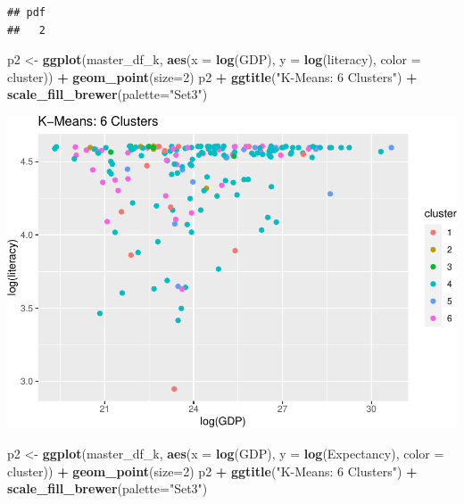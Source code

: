 \documentclass[]{article}
\newenvironment{Shaded}{\begin{snugshade}}{\end{snugshade}}
\newcommand{\DataTypeTok}[1]{\textcolor[rgb]{0.13,0.29,0.53}{#1}}
\newcommand{\DecValTok}[1]{\textcolor[rgb]{0.00,0.00,0.81}{#1}}
\newcommand{\KeywordTok}[1]{\textcolor[rgb]{0.13,0.29,0.53}{\textbf{#1}}}
\newcommand{\NormalTok}[1]{#1}
\newcommand{\OperatorTok}[1]{\textcolor[rgb]{0.81,0.36,0.00}{\textbf{#1}}}
\newcommand{\StringTok}[1]{\textcolor[rgb]{0.31,0.60,0.02}{#1}}
\begin{document}
\begin{verbatim}
## pdf 
##   2
\end{verbatim}

\begin{Shaded}
\begin{Highlighting}[]
\NormalTok{p2 <-}\StringTok{ }\KeywordTok{ggplot}\NormalTok{(master_df_k, }\KeywordTok{aes}\NormalTok{(}\DataTypeTok{x =} \KeywordTok{log}\NormalTok{(GDP), }\DataTypeTok{y =} \KeywordTok{log}\NormalTok{(literacy), }\DataTypeTok{color =}\NormalTok{ cluster)) }\OperatorTok{+}
\StringTok{  }\KeywordTok{geom_point}\NormalTok{(}\DataTypeTok{size=}\DecValTok{2}\NormalTok{)}
\NormalTok{p2 }\OperatorTok{+}\StringTok{ }\KeywordTok{ggtitle}\NormalTok{(}\StringTok{"K-Means: 6 Clusters"}\NormalTok{) }\OperatorTok{+}\StringTok{ }\KeywordTok{scale_fill_brewer}\NormalTok{(}\DataTypeTok{palette=}\StringTok{"Set3"}\NormalTok{)}
\end{Highlighting}
\end{Shaded}

\includegraphics{eda_files/figure-latex/unnamed-chunk-26-3.pdf}

\begin{Shaded}
\begin{Highlighting}[]
\NormalTok{p2 <-}\StringTok{ }\KeywordTok{ggplot}\NormalTok{(master_df_k, }\KeywordTok{aes}\NormalTok{(}\DataTypeTok{x =} \KeywordTok{log}\NormalTok{(GDP), }\DataTypeTok{y =} \KeywordTok{log}\NormalTok{(Expectancy), }\DataTypeTok{color =}\NormalTok{ cluster)) }\OperatorTok{+}
\StringTok{  }\KeywordTok{geom_point}\NormalTok{(}\DataTypeTok{size=}\DecValTok{2}\NormalTok{)}
\NormalTok{p2 }\OperatorTok{+}\StringTok{ }\KeywordTok{ggtitle}\NormalTok{(}\StringTok{"K-Means: 6 Clusters"}\NormalTok{) }\OperatorTok{+}\StringTok{ }\KeywordTok{scale_fill_brewer}\NormalTok{(}\DataTypeTok{palette=}\StringTok{"Set3"}\NormalTok{)}
\end{Highlighting}
\end{Shaded}
\end{document}
